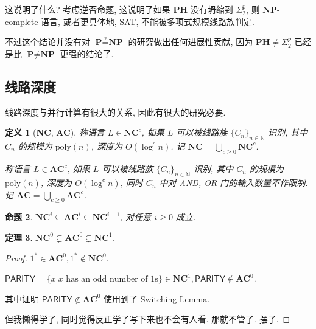 \documentclass[8pt]{article}
\theoremstyle{compact}
\newtheorem{theorem}{定理}[section]
\newtheorem{definition}[theorem]{定义}
\newtheorem{proposition}[theorem]{命题}
\def\ge{\geqslant}
\def\P{\textbf{P}}
\def\NP{\textbf{NP}}
\def\PH{\textbf{PH}}
\def\NC{\textbf{NC}}
\def\AC{\textbf{AC}}
\begin{document}
这说明了什么? 考虑逆否命题, 这说明了如果 $\PH$ 没有坍缩到 $\Sigma_2^p$, 则 $\NP$-complete 语言, 或者更具体地, \textsf{SAT}, 不能被多项式规模线路族判定.

不过这个结论并没有对 $\P \overset{?}{=} \NP$ 的研究做出任何进展性贡献, 因为 $\PH \neq \Sigma_2^p$ 已经是比 $\P \neq \NP$ 更强的结论了.

\subsection{线路深度}
线路深度与并行计算有很大的关系, 因此有很大的研究必要.
\begin{definition}[\NC, \AC]
	称语言 $L \in \NC^c$, 如果 $L$ 可以被线路族 $\{C_n\}_{n \in \mathbb N}$ 识别, 其中 $C_n$ 的规模为 $\text{poly}(n)$, 深度为 $O(\log^cn)$. 记 $\NC = \bigcup_{c \ge 0} \NC^c$.

	称语言 $L \in \AC^c$, 如果 $L$ 可以被线路族 $\{C_n\}_{n \in \mathbb N}$ 识别, 其中 $C_n$ 的规模为 $\text{poly}(n)$, 深度为 $O(\log^cn)$, 同时 $C_n$ 中对 AND, OR 门的输入数量不作限制. 记 $\AC = \bigcup_{c \ge 0} \AC^c$.
\end{definition}
\begin{proposition}
	$\NC^i \subseteq \AC^i \subseteq \NC^{i + 1}$, 对任意 $i \ge 0$ 成立.
\end{proposition}
\begin{theorem}
	$\NC^0 \subsetneq \AC^0 \subsetneq \NC^1$.
\end{theorem}
\begin{proof}
	$1^* \in \AC^0, 1^* \notin \NC^0$.

	$\textsf{PARITY} = \{x | x \text{ has an odd number of 1s}\} \in \NC^1, \textsf{PARITY} \notin \AC^0$. 

	其中证明 $\textsf{PARITY} \notin \AC^0$ 使用到了 Switching Lemma.
	
	但我懒得学了, 同时觉得反正学了写下来也不会有人看. 那就不管了. 摆了.
\end{proof}

\newpage
\end{document}
